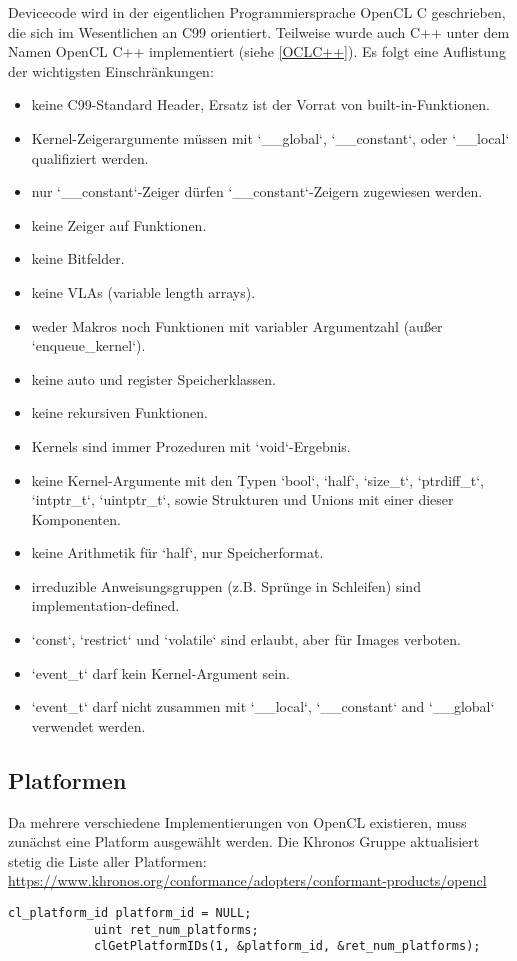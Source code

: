 		Devicecode wird in der eigentlichen Programmiersprache OpenCL C geschrieben, die sich im Wesentlichen an C99 orientiert. Teilweise wurde auch C++ unter dem Namen OpenCL C++ implementiert (siehe \ref{OCLC++}). Es folgt eine Auflistung der wichtigsten Einschränkungen:
		\begin{itemize}
		\item keine C99-Standard Header, Ersatz ist der Vorrat von built-in-Funktionen.
		\item Kernel-Zeigerargumente müssen mit \li`__global`, \li`__constant`, oder \li`__local` qualifiziert werden.  
		\item nur \li`__constant`-Zeiger dürfen \li`__constant`-Zeigern zugewiesen werden.
		\item keine Zeiger auf Funktionen.
		\item keine Bitfelder.
		\item keine VLAs (variable length arrays).
		\item weder Makros noch Funktionen mit variabler Argumentzahl (außer \li`enqueue_kernel`).
		\item keine auto und register Speicherklassen.
		\item keine rekursiven Funktionen.
		\item \Glspl{Kernel} sind immer Prozeduren mit \li`void`-Ergebnis.
		\item keine \Gls{Kernel}-Argumente mit den Typen \li`bool`, \li`half`, \li`size_t`, \li`ptrdiff_t`, \li`intptr_t`, \li`uintptr_t`, sowie Strukturen und Unions mit einer dieser Komponenten.
		\item keine Arithmetik für \li`half`, nur Speicherformat.
		\item irreduzible Anweisungsgruppen (z.B. Sprünge in Schleifen) sind implementation-defined.
		\item \li`const`, \li`restrict` und \li`volatile` sind erlaubt, aber für Images verboten.
		\item \li`event_t` darf kein \Gls{Kernel}-Argument sein.
		\item  \li`event_t` darf nicht zusammen mit \li`__local`, \li`__constant` and \li`__global` verwendet werden.
		\end{itemize}
		
			\subsection{Platformen}
			Da mehrere verschiedene Implementierungen von OpenCL existieren, muss zunächst eine \Gls{Platform} ausgewählt werden. Die Khronos Gruppe aktualisiert stetig die Liste aller Platformen: \url{https://www.khronos.org/conformance/adopters/conformant-products/opencl}
			\begin{lstlisting}[caption=Platformabfrage]
			cl_platform_id platform_id = NULL;
			uint ret_num_platforms;
			clGetPlatformIDs(1, &platform_id, &ret_num_platforms);
			\end{lstlisting}

